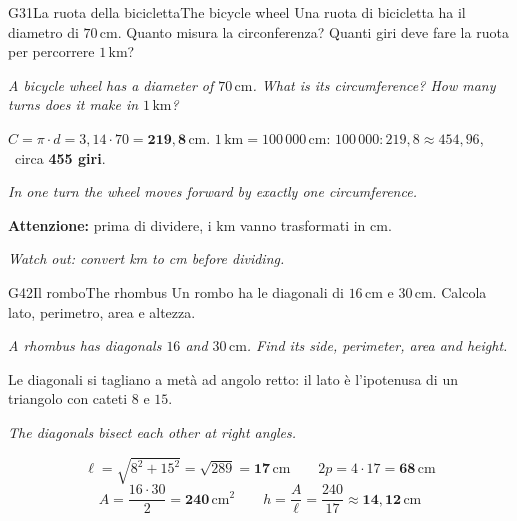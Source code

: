 \documentclass[11pt,a4paper]{article}
\newcommand{\en}[1]{\par{\small\itshape\color{engray}#1\par}}
\newcommand{\unit}[1]{\,\mathrm{#1}}
\newcommand{\cm}{\unit{cm}}
\newcommand{\cmq}{\unit{cm^2}}
\newcommand{\errore}[2]{\begin{attenzione}\textbf{\color{fgA}Attenzione:} #1\par
  {\itshape\color{engray}Watch out: #2}\end{attenzione}}
\begin{document}
\begin{esercizio}{G3}{1}{La ruota della bicicletta}{The bicycle wheel}
Una ruota di bicicletta ha il diametro di $70\cm$. Quanto misura la circonferenza? Quanti giri deve fare la ruota per percorrere $1\unit{km}$?
\en{A bicycle wheel has a diameter of $70\cm$. What is its circumference? How many turns does it make in $1\unit{km}$?}
\end{esercizio}
\begin{solbox}
$C=\pi\cdot d=3,14\cdot70=\mathbf{219,8\cm}$. \quad $1\unit{km}=100\,000\cm$: \quad $100\,000:219,8\approx454,96$, \ circa \textbf{455 giri}.
\en{In one turn the wheel moves forward by exactly one circumference.}
\errore{prima di dividere, i km vanno trasformati in cm.}{convert km to cm before dividing.}
\end{solbox}

\begin{esercizio}{G4}{2}{Il rombo}{The rhombus}
Un rombo ha le diagonali di $16\cm$ e $30\cm$. Calcola lato, perimetro, area e altezza.
\en{A rhombus has diagonals $16$ and $30\cm$. Find its side, perimeter, area and height.}
\begin{center}
\end{center}
\end{esercizio}
\begin{solbox}
Le diagonali si tagliano a metà ad angolo retto: il lato è l'ipotenusa di un triangolo con cateti $8$ e $15$.
\en{The diagonals bisect each other at right angles.}
\[\ell=\sqrt{8^2+15^2}=\sqrt{289}=\mathbf{17\cm}\qquad 2p=4\cdot17=\mathbf{68\cm}\]
\[A=\frac{16\cdot30}{2}=\mathbf{240\cmq}\qquad h=\frac{A}{\ell}=\frac{240}{17}\approx\mathbf{14,12\cm}\]
\end{solbox}
\end{document}
